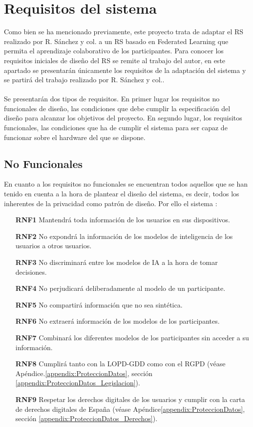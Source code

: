 \section{Requisitos del sistema}
Como bien se ha mencionado previamente, este proyecto trata de adaptar el RS realizado por R. Sánchez y col.\autocite{sanchez-corcueraPersuasionbasedRecommenderSystem2020} a un RS basado en Federated Learning que permita el aprendizaje colaborativo de los participantes. Para conocer los requisitos iniciales de diseño del RS se remite al trabajo del autor, en este apartado se presentarán únicamente los requisitos de la adaptación del sistema y se partirá del trabajo realizado por R. Sánchez y col.. 
\\ \\
Se presentarán dos tipos de requisitos. En primer lugar los requisitos no funcionales de diseño, las condiciones que debe cumplir la especificación del diseño para alcanzar los objetivos del proyecto. En segundo lugar, los requisitos funcionales, las condiciones que ha de cumplir el sistema para ser capaz de funcionar sobre el hardware del que se dispone.

\subsection{No Funcionales}
En cuanto a los requisitos no funcionales se encuentran todos aquellos que se han tenido en cuenta a la hora de plantear el diseño del sistema, es decir, todos los inherentes de la privacidad como patrón de diseño. Por ello el sistema :
\begin{itemize}
    \item [\textbf{RNF1}] Mantendrá toda información de los usuarios en sus dispositivos.
    \item [\textbf{RNF2}] No expondrá la información de los modelos de inteligencia de los usuarios a otros usuarios.
    \item [\textbf{RNF3}] No discriminará entre los modelos de IA a la hora de tomar decisiones.
    \item [\textbf{RNF4}] No perjudicará deliberadamente al modelo de un participante.
    \item [\textbf{RNF5}] No compartirá información que no sea sintética.
    \item [\textbf{RNF6}] No extraerá información de los modelos de los participantes.
    \item [\textbf{RNF7}] Combinará los diferentes modelos de los participantes sin acceder a su información.
    \item [\textbf{RNF8}] Cumplirá tanto con la LOPD-GDD como con el RGPD (véase Apéndice.\ref{appendix:ProteccionDatos}, sección \ref{appendix:ProteccionDatos_Legislacion}).
    \item [\textbf{RNF9}] Respetar los derechos digitales de los usuarios y cumplir con la carta de derechos digitales de España (véase Apéndice\ref{appendix:ProteccionDatos}, sección \ref{appendix:ProteccionDatos_Derechos}).
\end{itemize}
